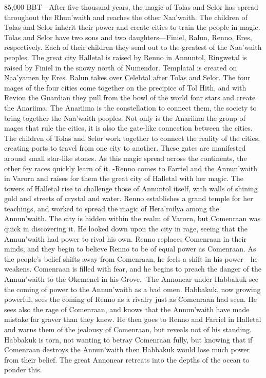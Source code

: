 \documentclass[smalldemyvopaper,11pt,twoside,onecolumn,openright,extrafontsizes]{memoir}
\begin{document}
{{85,000 BBT—After five thousand years, the magic of Tolas and Selor has spread throughout the Rhun’waith and reaches the other Naa’waith. The children of Tolas and Selor inherit their power and create cities to train the people in magic. Tolas and Selor have two sons and two daughters—Finiel, Ralun, Renno, Eres, respectively. Each of their children they send out to the greatest of the Naa’waith peoples. The great city Halletal is raised by Renno in Annuntol, Ringwetal is raised by Finiel in the snowy north of Numendor. Templatal is created on Naa’yamen by Eres. Ralun takes over Celebtal after Tolas and Selor. The four mages of the four cities come together on the precipice of Tol Hith, and with Revion the Guardian they pull from the bowl of the world four stars and create the Anariima. The Anariima is the constellation to connect them, the society to bring together the Naa’waith peoples. Not only is the Anariima the group of mages that rule the cities, it is also the gate-like connection between the cities. The children of Tolas and Selor work together to connect the reality of the cities, creating ports to travel from one city to another. These gates are manifested around small star-like stones.
	As this magic spread across the continents, the other fey races quickly learn of it.
-Renno comes to Farriel and the Annun’waith in Varorn and raises for them the great city of Halletal with her magic. The towers of Halletal rise to challenge those of Annuntol itself, with walls of shining gold and streets of crystal and water. Renno establishes a grand temple for her teachings, and worked to spread the magic of Hera’roilya among the Annun’waith. The city is hidden within the realm of Varorn, but Comenraan was quick in discovering it. He looked down upon the city in rage, seeing that the Annun’waith had power to rival his own. Renno replaces Comenraan in their minds, and they begin to believe Renno to be of equal power as Comenraan. As the people’s belief shifts away from Comenraan, he feels a shift in his power—he weakens. Comenraan is filled with fear, and he begins to preach the danger of the Annun’waith to the Okemenel in his Grove.
-The Annonear under Habbakuk see the coming of power to the Annun’waith as a bad omen. Habbakuk, now growing powerful, sees the coming of Renno as a rivalry just as Comenraan had seen. He sees also the rage of Comenraan, and knows that the Annun’waith have made mistake far graver than they knew. He then goes to Renno and Farriel in Halletal and warns them of the jealousy of Comenraan, but reveals not of his standing. Habbakuk is torn, not wanting to betray Comenraan fully, but knowing that if Comenraan destroys the Annun’waith then Habbakuk would lose much power from their belief. The great Annonear retreats into the depths of the ocean to ponder this.
}}
\end{document}
